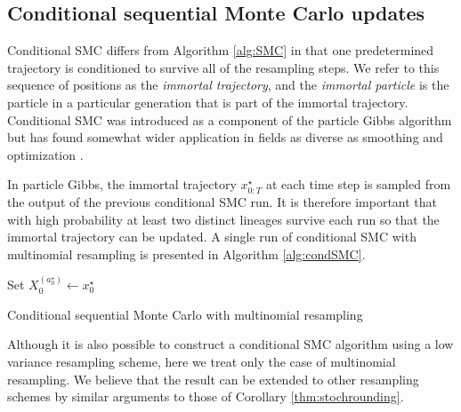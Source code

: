 \documentclass{article}
\theoremstyle{definition}
\newcommand{\1}[1]{\mathbbm{1}_{\{#1\}}}
\begin{document}
\subsection{Conditional sequential Monte Carlo updates}

Conditional SMC differs from Algorithm \ref{alg:SMC} in that one predetermined trajectory is conditioned to survive all of the resampling steps. 
We refer to this sequence of positions as the \emph{immortal trajectory}, and the \emph{immortal particle} is the particle in a particular generation that is part of the immortal trajectory.
Conditional SMC was introduced as a component of the particle Gibbs algorithm \citep{andrieu2010} but has found somewhat wider application in fields as diverse as smoothing \citep{jacob19,shestopaloff19} and optimization \citep[Chapter 6]{finke15}. 

In particle Gibbs, the immortal trajectory $x_{0:T}^\star$ at each time step is sampled from the output of the previous conditional SMC run. It is therefore important that with high probability at least two distinct lineages survive each run so that the immortal trajectory can be updated.
A single run of conditional SMC with multinomial resampling is presented in Algorithm \ref{alg:condSMC}.

\vspace{10pt}
\begin{algorithm}[H]
\DontPrintSemicolon
{}
Set $X_0^{(a_0^\star)} \gets x_0^\star$\;
\caption{Conditional sequential Monte Carlo with multinomial resampling}
\label{alg:condSMC}
\end{algorithm}
\vspace{10pt}

Although it is also possible to construct a conditional SMC algorithm using a low variance resampling scheme, here we treat only the case of multinomial resampling. We believe that the result can be extended to other resampling schemes by similar arguments to those of Corollary \ref{thm:stochrounding}.
\end{document}
